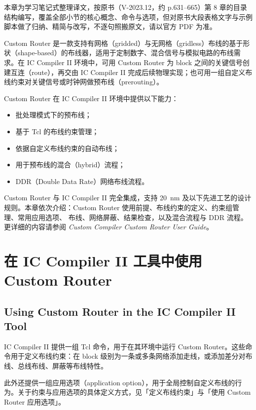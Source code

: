 \label{chap:customroute}

\begin{noteBox}
本章为学习笔记式整理译文，按原书（V-2023.12，约 p.631--665）第 8 章的目录结构编写，覆盖全部小节的核心概念、命令与选项，但对原书大段表格文字与示例脚本做了归纳、精简与改写，不逐句照搬原文，请以官方 PDF 为准。
\end{noteBox}

Custom Router 是一款支持有网格（gridded）与无网格（gridless）布线的基于形状（shape-based）的布线器，适用于定制数字、混合信号与模拟电路的布线需求。在 IC Compiler II 环境中，可用 Custom Router 为 block 之间的关键信号创建互连（route），再交由 IC Compiler II 完成后续物理实现；也可用一组自定义布线约束对关键信号或时钟网做预布线（prerouting）。

Custom Router 在 IC Compiler II 环境中提供以下能力：
\begin{itemize}
  \item 批处理模式下的预布线；
  \item 基于 Tcl 的布线约束管理；
  \item 依据自定义布线约束的自动布线；
  \item 用于预布线的混合（hybrid）流程；
  \item DDR（Double Data Rate）网络布线流程。
\end{itemize}

Custom Router 与 IC Compiler II 完全集成，支持 20~nm 及以下先进工艺的设计规则。本章依次介绍：Custom Router 使用前提、布线约束的定义、约束组管理、常用应用选项、 布线、网络屏蔽、结果检查，以及混合流程与 DDR 流程。更详细的内容请参阅 \textit{Custom Compiler Custom Router User Guide}。

\section{在 IC Compiler II 工具中使用 Custom Router}
\subsection*{Using Custom Router in the IC Compiler II Tool}

IC Compiler II 提供一组 Tcl 命令，用于在其环境中运行 Custom Router。这些命令用于定义布线约束：在 block 级别为一条或多条网络添加走线，或添加差分对布线、总线布线、屏蔽等布线特性。

此外还提供一组应用选项（application option），用于全局控制自定义布线的行为。关于约束与应用选项的具体定义方式，见「定义布线约束」与「使用 Custom Router 应用选项」。


